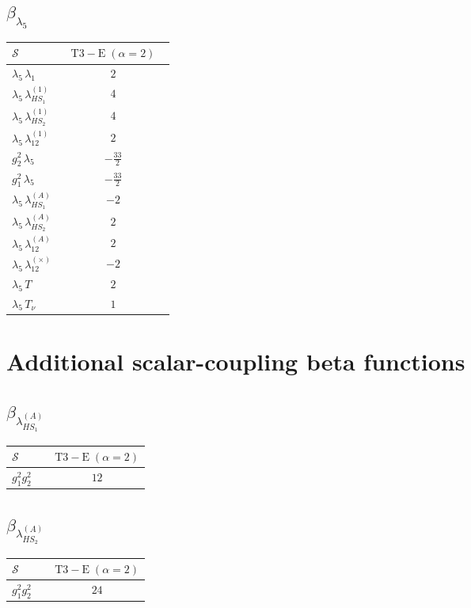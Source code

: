 \documentclass[9pt]{article}
\begin{document}
\subsection*{$ \beta_{\lambda_5} $}
\begin{longtable}{@{}p{0.31\linewidth}c@{}}
\toprule
$\mathcal{S}$ & $ \mathrm{T3-E}\;(\alpha=2) $ \\
\midrule
$ \lambda_5\,\lambda_1 $ & $ 2 $ \\
$ \lambda_5\,\lambda_{HS_1}^{(1)} $ & $ 4 $ \\
$ \lambda_5\,\lambda_{HS_2}^{(1)} $ & $ 4 $ \\
$ \lambda_5\,\lambda_{12}^{(1)} $ & $ 2 $ \\
$ g_2^2\,\lambda_5 $ & $ - \frac{33}{2} $ \\
$ g_1^2\,\lambda_5 $ & $ - \frac{33}{2} $ \\
$ \lambda_5\,\lambda_{HS_1}^{(A)} $ & $ -2 $ \\
$ \lambda_5\,\lambda_{HS_2}^{(A)} $ & $ 2 $ \\
$ \lambda_5\,\lambda_{12}^{(A)} $ & $ 2 $ \\
$ \lambda_5\,\lambda_{12}^{(\times)} $ & $ -2 $ \\
$ \lambda_5\,T $ & $ 2 $ \\
$ \lambda_5\,T_\nu $ & $ 1 $ \\
\bottomrule
\end{longtable}
\section*{Additional scalar-coupling beta functions}
\subsection*{$ \beta_{\lambda_{HS_1}^{(A)}} $}
\begin{longtable}{@{}p{0.31\linewidth}c@{}}
\toprule
$\mathcal{S}$ & $ \mathrm{T3-E}\;(\alpha=2) $ \\
\midrule
$ g_1^2g_2^2 $ & $ 12 $ \\
\bottomrule
\end{longtable}
\subsection*{$ \beta_{\lambda_{HS_2}^{(A)}} $}
\begin{longtable}{@{}p{0.31\linewidth}c@{}}
\toprule
$\mathcal{S}$ & $ \mathrm{T3-E}\;(\alpha=2) $ \\
\midrule
$ g_1^2g_2^2 $ & $ 24 $ \\
\bottomrule
\end{longtable}
\end{document}
